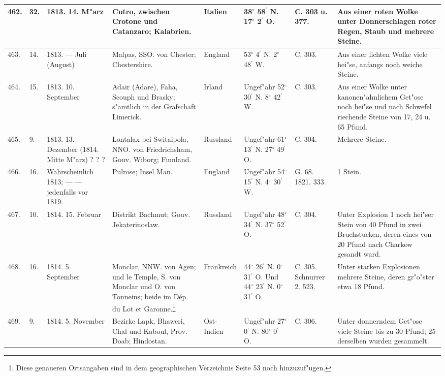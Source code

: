 \documentclass[a4paper, 8pt, oneside, polutonikogreek, german]{article}
\begin{document}
\begin{center}
\begin{longtable}{| p{4mm} | p{2mm} | p{15mm} | p{25mm} | p{16mm} | p{12mm} | p{13mm} | p{20mm} |}
        462. & 32. & 1813. 14. M"arz & Cutro, zwischen Crotone und Catanzaro; Kalabrien. & Italien & 38$^\circ$ 58$^\prime$ N. 17$^\circ$ 2$^\prime$ O. & C. 303 u. 377. & Aus einer roten Wolke unter Donnerschlagen roter Regen, Staub und mehrere Steine. \\ \hline
        463. & 14. & 1813. --- Juli (August) & Malpas, SSO. von Chester; Chestershire. & England & 53$^\circ$ 4$^\prime$ N. 2$^\circ$ 48$^\prime$ W. & C. 303. & Aus einer lichten Wolke viele hei"se, anfangs noch weiche Steine. \\ \hline
        464. & 15. & 1813. 10. September & Adair (Adare), Faha, Scouph und Brasky; s"amtlich in der Grafschaft Limerick. & Irland & Ungef"ahr 52$^\circ$ 30$^\prime$ N. 8$^\circ$ 42$^\prime$ W. & C. 303. & Aus einer Wolke unter kanonen"ahnlichem Get"ose noch hei"se und nach Schwefel riechende Steine von 17, 24 u. 65 Pfund. \\ \hline
        465. & 9. & 1813. 13. Dezember (1814. Mitte M"arz) ? ? ? & Lontalax bei Switaipola, NNO. von Friedrichsham, Gouv. Wiborg; Finnland. & Russland & Ungef"ahr 61$^\circ$ 13$^\prime$ N. 27$^\circ$ 49$^\prime$ O. & C. 304. & Mehrere Steine. \\ \hline
        466. & 16. & Wahrscheinlich 1813; --- --- jedenfalls vor 1819. & Pulrose; Insel Man. & England & Ungef"ahr 54$^\circ$ 15$^\prime$ N. 4$^\circ$ 30$^\prime$ W. & G. 68. 1821. 333. & 1 Stein. \\ \hline
        467. & 10. & 1814. 15. Februar & Distrikt Bachmut; Gouv. Jekaterinoslaw. & Russland & Ungef"ahr 48$^\circ$ 34$^\prime$ N. 37$^\circ$ 52$^\prime$ O. & C. 304. & Unter Explosion 1 noch hei"ser Stein von 40 Pfund in zwei Bruchstucken, deren eines von 20 Pfund nach Charkow gesandt ward. \\ \hline
        468. & 16. & 1814. 5. September & Monclar, NNW. von Agen; und le Temple, S. von Monclar und O. von Tonneins; beide im Dép. du Lot et Garonne.\footnote{Diese genaueren Ortsangaben sind in dem geographischen Verzeichnis Seite 53 noch hinzuzuf"ugen.} & Frankreich & 44$^\circ$ 26$^\prime$ N. 0$^\circ$ 31$^\prime$ O. Und 44$^\circ$ 23$^\prime$ N. 0$^\circ$ 31$^\prime$ O. & C. 305. Schnurrer 2. 523. & Unter starken Explosionen mehrere Steine, deren gr"o"ster etwa 18 Pfund. \\ \hline
        469. & 9. & 1814. 5. November & Bezirke Lapk, Bhaweri, Chal und Kaboul, Prov. Doab; Hindostan. & Ost-Indien & Ungef"ahr 27$^\circ$ 0$^\prime$ N. 80$^\circ$ 0$^\prime$ O. & C. 306. & Unter donnerndem Get"ose viele Steine bis zu 30 Pfund; 25 derselben wurden gesammelt. \\ \hline

\end{longtable}
\end{center}
\end{document}
